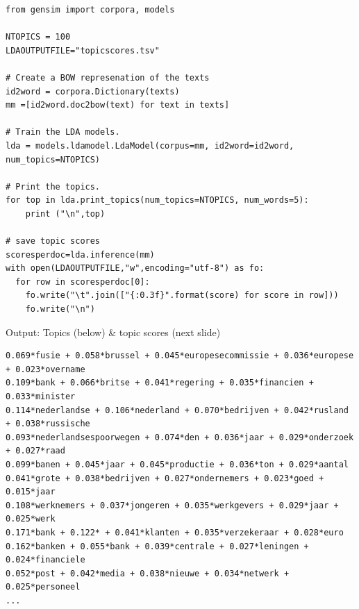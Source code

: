 \documentclass{beamer}
\begin{document}
\begin{frame}
\begin{lstlisting}
from gensim import corpora, models

NTOPICS = 100
LDAOUTPUTFILE="topicscores.tsv"

# Create a BOW represenation of the texts
id2word = corpora.Dictionary(texts)
mm =[id2word.doc2bow(text) for text in texts]

# Train the LDA models.
lda = models.ldamodel.LdaModel(corpus=mm, id2word=id2word, num_topics=NTOPICS)

# Print the topics.
for top in lda.print_topics(num_topics=NTOPICS, num_words=5):
    print ("\n",top)

# save topic scores
scoresperdoc=lda.inference(mm)
with open(LDAOUTPUTFILE,"w",encoding="utf-8") as fo:
  for row in scoresperdoc[0]:
    fo.write("\t".join(["{:0.3f}".format(score) for score in row]))
    fo.write("\n")
\end{lstlisting}

\end{frame}




\begin{frame}[fragile]{Output: Topics (below) \& topic scores (next slide)}
\begin{lstlisting}
0.069*fusie + 0.058*brussel + 0.045*europesecommissie + 0.036*europese + 0.023*overname
0.109*bank + 0.066*britse + 0.041*regering + 0.035*financien + 0.033*minister
0.114*nederlandse + 0.106*nederland + 0.070*bedrijven + 0.042*rusland + 0.038*russische
0.093*nederlandsespoorwegen + 0.074*den + 0.036*jaar + 0.029*onderzoek + 0.027*raad
0.099*banen + 0.045*jaar + 0.045*productie + 0.036*ton + 0.029*aantal
0.041*grote + 0.038*bedrijven + 0.027*ondernemers + 0.023*goed + 0.015*jaar
0.108*werknemers + 0.037*jongeren + 0.035*werkgevers + 0.029*jaar + 0.025*werk
0.171*bank + 0.122* + 0.041*klanten + 0.035*verzekeraar + 0.028*euro
0.162*banken + 0.055*bank + 0.039*centrale + 0.027*leningen + 0.024*financiele
0.052*post + 0.042*media + 0.038*nieuwe + 0.034*netwerk + 0.025*personeel
...
\end{lstlisting}
\end{frame}
\end{document}
